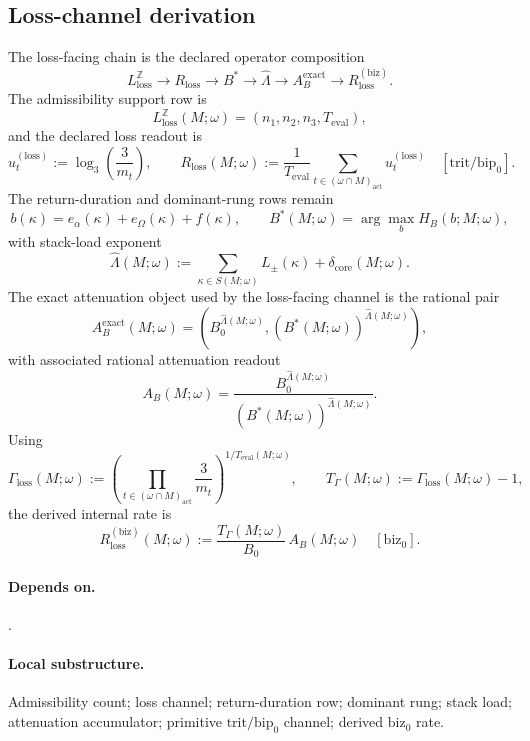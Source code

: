 \subsection{Loss-channel derivation}\label{subsec:loss-channel-derivation}
\begin{definition}
\label{def:loss-channel-derivation}
The loss-facing chain is the declared operator composition
\[
L_{\mathrm{loss}}^{\mathbb Z}
\rightarrow
R_{\mathrm{loss}}
\rightarrow
B^*
\rightarrow
\widehat\Lambda
\rightarrow
A_B^{\mathrm{exact}}
\rightarrow
R_{\mathrm{loss}}^{(\mathrm{biz})}.
\]
The admissibility support row is
\[
L_{\mathrm{loss}}^{\mathbb Z}(M;\omega)=(n_1,n_2,n_3,T_{\mathrm{eval}}),
\]
and the declared loss readout is
\[
u_t^{(\mathrm{loss})}:=\log_3\!\left(\frac{3}{m_t}\right),
\qquad
R_{\mathrm{loss}}(M;\omega):=\frac{1}{T_{\mathrm{eval}}}\sum_{t\in(\omega\cap M)_{\mathrm{act}}}u_t^{(\mathrm{loss})}
\quad[\mathrm{trit}/\mathrm{bip}_0].
\]
The return-duration and dominant-rung rows remain
\[
b(\kappa)=e_{\alpha}(\kappa)+e_{\Omega}(\kappa)+f(\kappa),
\qquad
B^*(M;\omega)=\arg\max_b H_B(b;M;\omega),
\]
with stack-load exponent
\[
\widehat\Lambda(M;\omega):=\sum_{\kappa\in S(M;\omega)}L_{\pm}(\kappa)+\delta_{\mathrm{core}}(M;\omega).
\]
The exact attenuation object used by the loss-facing channel is the rational pair
\[
A_B^{\mathrm{exact}}(M;\omega)=
\left(B_0^{\widehat\Lambda(M;\omega)},(B^*(M;\omega))^{\widehat\Lambda(M;\omega)}\right),
\]
with associated rational attenuation readout
\[
A_B(M;\omega)=\frac{B_0^{\widehat\Lambda(M;\omega)}}{(B^*(M;\omega))^{\widehat\Lambda(M;\omega)}}.
\]
Using
\[
\Gamma_{\mathrm{loss}}(M;\omega):=\left(\prod_{t\in(\omega\cap M)_{\mathrm{act}}}\frac{3}{m_t}\right)^{1/T_{\mathrm{eval}}(M;\omega)},
\qquad
T_\Gamma(M;\omega):=\Gamma_{\mathrm{loss}}(M;\omega)-1,
\]
the derived internal rate is
\[
R_{\mathrm{loss}}^{(\mathrm{biz})}(M;\omega):=\frac{T_\Gamma(M;\omega)}{B_0}\,A_B(M;\omega)
\quad[\mathrm{biz}_0].
\]
\end{definition}

\paragraph{Depends on.} .
\paragraph{Local substructure.} Admissibility count; loss channel; return-duration row; dominant rung; stack load; attenuation accumulator; primitive \(\mathrm{trit}/\mathrm{bip}_0\) channel; derived \(\mathrm{biz}_0\) rate.
